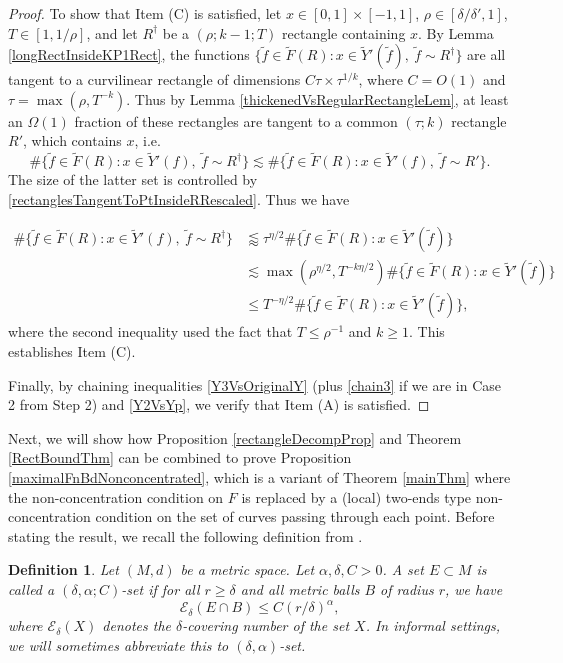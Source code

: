 \documentclass[letterpaper, reqno,11pt]{article}
\numberwithin{equation}{section}
\numberwithin{thm}{section}
\newtheorem{defn}[thm]{Definition}
\theoremstyle{remark}
\begin{document}
\begin{proof}
To show that Item (C) is satisfied, let $x\in [0,1]\times[-1,1]$, $\rho\in [\delta/\delta', 1]$, $T\in [1, 1/\rho]$, and let $R^\dag$ be a $(\rho; k-1; T)$ rectangle containing $x$. By Lemma \ref{longRectInsideKP1Rect}, the functions $\{\tilde f\in \tilde F(R)\colon x\in \tilde Y'(\tilde f),\ \tilde f\sim  R^\dag\}$ are all tangent to a curvilinear rectangle of dimensions $C\tau\times \tau^{1/k}$, where $C = O(1)$ and $\tau = \max(\rho, T^{-k})$. Thus by Lemma \ref{thickenedVsRegularRectangleLem}, at least an $\Omega(1)$ fraction of these rectangles are tangent to a common $(\tau;k)$ rectangle $R'$, which contains $x$, i.e.
\[
\#\{\tilde f\in \tilde F(R)\colon x\in \tilde Y'(f),\ \tilde f\sim  R^\dag\}\lesssim  \#\{\tilde f\in \tilde F(R)\colon x\in \tilde Y'(f),\ \tilde f\sim  R'\}.
\]
The size of the latter set is controlled by \eqref{rectanglesTangentToPtInsideRRescaled}. Thus we have

\begin{equation*} 
\begin{split}
\#\{\tilde f\in \tilde F(R)\colon x\in \tilde Y'(f),\ \tilde f\sim  R^\dag\}&  \lessapprox \tau^{\eta/2}\#\{\tilde f\in \tilde F(R)\colon x\in \tilde Y'(\tilde f)\}\\
& \lesssim \max(\rho^{\eta/2}, T^{-k\eta/2})\#\{\tilde f\in \tilde F(R)\colon x\in \tilde Y'(\tilde f)\}\\
& \leq T^{-\eta/2}\#\{\tilde f\in \tilde F(R)\colon x\in \tilde Y'(\tilde f)\},
\end{split}
\end{equation*}
where the second inequality used the fact that $T\leq \rho^{-1}$ and $k\geq 1$. This establishes Item (C).

Finally, by chaining inequalities \eqref{Y3VsOriginalY} (plus \eqref{chain3} if we are in Case 2 from Step 2)  and \eqref{Y2VsYp}, we verify that Item (A) is satisfied.
\end{proof}



Next, we will show how Proposition \ref{rectangleDecompProp} and Theorem \ref{RectBoundThm} can be combined to prove Proposition \ref{maximalFnBdNonconcentrated}, which is a variant of Theorem \ref{mainThm} where the non-concentration condition on $F$ is replaced by a (local) two-ends type non-concentration condition on the set of curves passing through each point. Before stating the result, we recall the following definition from \cite{KatzTao}.
%
\begin{defn}\label{defnKTSet}
Let $(M,d)$ be a metric space. Let $\alpha,\delta,C>0$. A set $E\subset M$ is called a $(\delta,\alpha;C)$-\emph{set} if for all $r\geq\delta$ and all metric balls $B$ of radius $r$, we have
\[
\mathcal{E}_{\delta}(E \cap B)\leq C(r/\delta)^{\alpha},
\] 
where $\mathcal{E}_{\delta}(X)$ denotes the $\delta$-covering number of the set $X$. In informal settings, we will sometimes abbreviate this to $(\delta,\alpha)$-set.
\end{defn}
\end{document}
